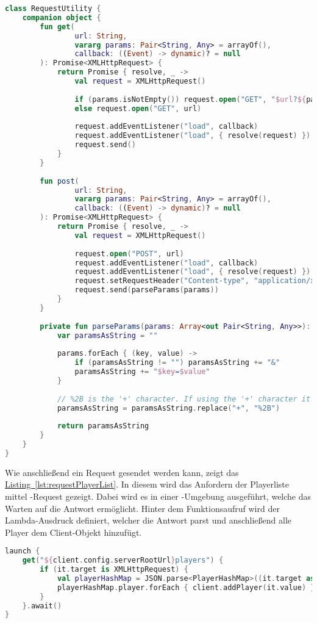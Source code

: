 \begin{lstlisting}[style=lstStyleFramed, language=Kotlin, caption={Implementierung der Request-Methoden \code{GET} und \code{POST}, inklusiver der Parameterverarbeitung}, label=lst:requestUtility, float]
class RequestUtility {
	companion object {
		fun get(
				url: String, 
				vararg params: Pair<String, Any> = arrayOf(), 
				callback: ((Event) -> dynamic)? = null
		): Promise<XMLHttpRequest> {
			return Promise { resolve, _ ->
				val request = XMLHttpRequest()
				
				if (params.isNotEmpty()) request.open("GET", "$url?${parseParams(params)}")
				else request.open("GET", url)
				
				request.addEventListener("load", callback)
				request.addEventListener("load", { resolve(request) })
				request.send()
			}
		}
	
		fun post(
				url: String, 
				vararg params: Pair<String, Any> = arrayOf(), 
				callback: ((Event) -> dynamic)? = null
		): Promise<XMLHttpRequest> {
			return Promise { resolve, _ ->
				val request = XMLHttpRequest()
				
				request.open("POST", url)
				request.addEventListener("load", callback)
				request.addEventListener("load", { resolve(request) })
				request.setRequestHeader("Content-type", "application/x-www-form-urlencoded")
				request.send(parseParams(params))
			}
		}
	
		private fun parseParams(params: Array<out Pair<String, Any>>): String {
			var paramsAsString = ""
			
			params.forEach { (key, value) ->
				if (paramsAsString != "") paramsAsString += "&"
				paramsAsString += "$key=$value"
			}
			
			// %2B is the '+' character. If using the '+' character it will parse into a space character
			paramsAsString = paramsAsString.replace("+", "%2B")
			
			return paramsAsString
		}
	}
}
\end{lstlisting}
Wie anschließend ein Request gesendet werden kann, zeigt das \hyperref[lst:requestPlayerList]{Listing~\ref{lst:requestPlayerList}}. In diesem wird das Anfordern der Playerliste mittel -Request gezeigt. Dabei wird es in einer -Umgebung ausgeführt, welche das Warten auf die Antwort ermöglicht. Hinter dem Funktionsaufruf wird der Lambda-Ausdruck definiert, welcher die Antwort parst und anschließend alle Player dem Client-Objekt hinzufügt.
\begin{lstlisting}[style=lstStyleFramed, language=Kotlin, caption={Funktionsaufruf eines \code{GET}-Requestes am Beispiel der Playerliste}, label=lst:requestPlayerList, float]
launch {
	get("${client.config.serverRootUrl}players") {
		if (it.target is XMLHttpRequest) {
			val playerHashMap = JSON.parse<PlayerHashMap>((it.target as XMLHttpRequest).responseText)
			playerHashMap.player.forEach { client.addPlayer(it.value) }
		}
	}.await()
}
\end{lstlisting}

